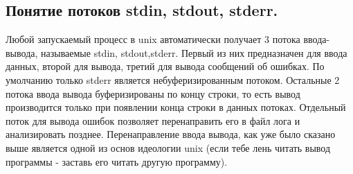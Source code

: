 \subsection{Понятие потоков stdin, stdout, stderr.}
Любой запускаемый процесс в unix автоматически получает 3 потока ввода-вывода, называемые stdin, stdout,stderr. Первый из них предназначен для ввода данных, второй для вывода, третий для вывода сообщений об ошибках. По умолчанию только stderr является небуферизированным потоком. Остальные 2 потока ввода вывода буферизированы по концу строки, то есть вывод производится только при появлении конца строки в данных потоках.
Отдельный поток для вывода ошибок позволяет перенаправить его в файл лога и анализировать позднее.
Перенаправление ввода вывода, как уже было сказано выше является одной из основ идеологии unix (если тебе лень читать вывод программы - заставь его читать другую программу). 
